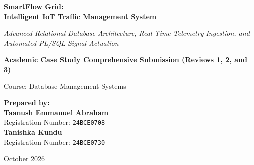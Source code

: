 \documentclass[11pt,a4paper]{report}
\begin{document}
\begin{titlepage}
    \centering
    \vspace*{1.5cm}
    
    {\Huge\bfseries SmartFlow Grid:\\[0.3cm] Intelligent IoT Traffic Management System \par}
    \vspace{0.8cm}
    {\Large\itshape Advanced Relational Database Architecture, Real-Time Telemetry Ingestion, and Automated PL/SQL Signal Actuation \par}
    
    \vspace{2cm}
    {\large\textbf{Academic Case Study Comprehensive Submission (Reviews 1, 2, and 3)}\par}
    \vspace{0.3cm}
    {\large Course: Database Management Systems \par}
    
    \vspace{2.5cm}
    \begin{minipage}{0.8\textwidth}
        \centering
        \textbf{Prepared by:}\\[0.4cm]
        {\large\textbf{Taanush Emmanuel Abraham}}\\[0.1cm]
        Registration Number: \texttt{24BCE0708}\\[0.6cm]
        {\large\textbf{Tanishka Kundu}}\\[0.1cm]
        Registration Number: \texttt{24BCE0730}
    \end{minipage}
    
    \vfill
    {\large October 2026 \par}
\end{titlepage}
\end{document}
